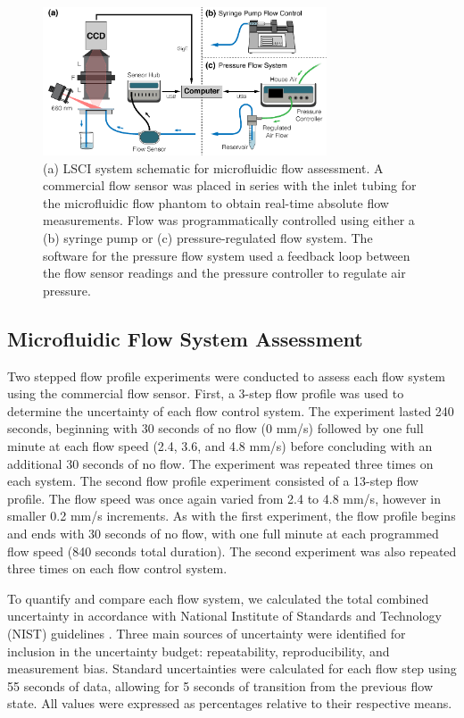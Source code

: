 \documentclass[12pt]{spieman}
\begin{document}
\begin{spacing}{2}
\begin{figure}
    \centering
    \includegraphics[width=0.75\textwidth]{Figure2.pdf}
    \caption {
        (a) LSCI system schematic for microfluidic flow assessment. A commercial flow sensor was placed in series with the inlet tubing for the microfluidic flow phantom to obtain real-time absolute flow measurements. Flow was programmatically controlled using either a (b) syringe pump or (c) pressure-regulated flow system. The software for the pressure flow system used a feedback loop between the flow sensor readings and the pressure controller to regulate air pressure.
    }
    \label{fig:system_lsci}
\end{figure}


\subsection{Microfluidic Flow System Assessment}
\label{sect:methods_flow_assess}

Two stepped flow profile experiments were conducted to assess each flow system using the commercial flow sensor. First, a 3-step flow profile was used to determine the uncertainty of each flow control system. The experiment lasted 240 seconds, beginning with 30 seconds of no flow (0 mm/s) followed by one full minute at each flow speed (2.4, 3.6, and 4.8 mm/s) before concluding with an additional 30 seconds of no flow. The experiment was repeated three times on each system. The second flow profile experiment consisted of a 13-step flow profile. The flow speed was once again varied from 2.4 to 4.8 mm/s, however in smaller 0.2 mm/s increments. As with the first experiment, the flow profile begins and ends with 30 seconds of no flow, with one full minute at each programmed flow speed (840 seconds total duration). The second experiment was also repeated three times on each flow control system. 

To quantify and compare each flow system, we calculated the total combined uncertainty in accordance with National Institute of Standards and Technology (NIST) guidelines \cite{Taylor.199438,NIST:2002}. Three main sources of uncertainty were identified for inclusion in the uncertainty budget: repeatability, reproducibility, and measurement bias. Standard uncertainties were calculated for each flow step using 55 seconds of data, allowing for 5 seconds of transition from the previous flow state. All values were expressed as percentages relative to their respective means.


\end{spacing}
\end{document}
